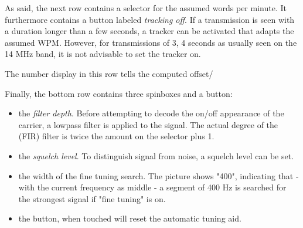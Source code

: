 \documentclass[11pt]{article}
\begin{document}
As said, the next row contains a selector for the assumed words per minute.
It furthermore contains a button labeled {\em tracking off}. If a transmission
is seen with a duration longer than a few seconds, a tracker can be activated
that adapts the assumed WPM. However, for transmissions of 3, 4 seconds
as usually seen on the 14 MHz band, it is not advisable to set the tracker on.

The number display in this row tells the computed offset/ 

Finally, the bottom row contains three spinboxes and a button:
\begin{itemize}
\item the {\em filter depth}. Before attempting to decode the on/off appearance
of the carrier, a lowpass filter is applied to the signal. The actual
degree of the (FIR) filter is twice the amount on the selector plus 1.
\item the {\em squelch level}. To distinguish signal from noise, a squelch level
can be set.
\item the width of the fine tuning search. The picture shows "400", indicating
that - with the current frequency as middle - a segment of 400 Hz is searched
for the strongest signal if "fine tuning" is on.
\item the button, when touched will reset the automatic tuning aid.
\end{itemize}
\end{document}
